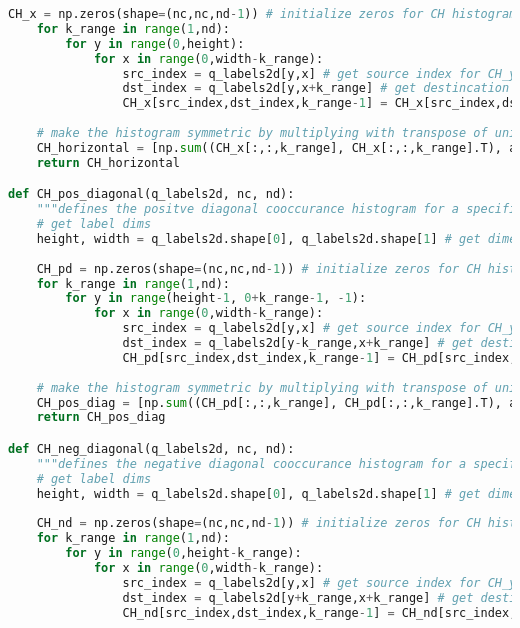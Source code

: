 \begin{lstlisting}[language=Python, caption={Additional functions for Co-occurrence Histogram Detection}, captionpos=b, label={lst:supportCH}]
    CH_x = np.zeros(shape=(nc,nc,nd-1)) # initialize zeros for CH histogram according to quantizations size
    for k_range in range(1,nd):
        for y in range(0,height):
            for x in range(0,width-k_range):
                src_index = q_labels2d[y,x] # get source index for CH_y at (y,x)
                dst_index = q_labels2d[y,x+k_range] # get destincation index for CH_y at (y+k,x)
                CH_x[src_index,dst_index,k_range-1] = CH_x[src_index,dst_index,k_range-1] + 1 # update histogram count in bin (src_index,dst_index)
    
    # make the histogram symmetric by multiplying with transpose of unidirectional cooccurance histogram
    CH_horizontal = [np.sum((CH_x[:,:,k_range], CH_x[:,:,k_range].T), axis=0) for k_range in range(0,nd-1)]
    return CH_horizontal

def CH_pos_diagonal(q_labels2d, nc, nd):
    """defines the positve diagonal cooccurance histogram for a specifica template according to quantized colourspace labels"""
    # get label dims
    height, width = q_labels2d.shape[0], q_labels2d.shape[1] # get dimensions
    
    CH_pd = np.zeros(shape=(nc,nc,nd-1)) # initialize zeros for CH histogram according to quantizations size
    for k_range in range(1,nd):
        for y in range(height-1, 0+k_range-1, -1):
            for x in range(0,width-k_range):
                src_index = q_labels2d[y,x] # get source index for CH_y at (y,x)
                dst_index = q_labels2d[y-k_range,x+k_range] # get destincation index for CH_y at (y+k,x)
                CH_pd[src_index,dst_index,k_range-1] = CH_pd[src_index,dst_index,k_range-1] + 1 # update histogram count in bin (src_index,dst_index)
    
    # make the histogram symmetric by multiplying with transpose of unidirectional cooccurance histogram
    CH_pos_diag = [np.sum((CH_pd[:,:,k_range], CH_pd[:,:,k_range].T), axis=0) for k_range in range(0,nd-1)]
    return CH_pos_diag

def CH_neg_diagonal(q_labels2d, nc, nd):
    """defines the negative diagonal cooccurance histogram for a specific template according to quantized colourspace labels"""
    # get label dims
    height, width = q_labels2d.shape[0], q_labels2d.shape[1] # get dimensions
        
    CH_nd = np.zeros(shape=(nc,nc,nd-1)) # initialize zeros for CH histogram according to quantizations size
    for k_range in range(1,nd):
        for y in range(0,height-k_range):
            for x in range(0,width-k_range):
                src_index = q_labels2d[y,x] # get source index for CH_y at (y,x)
                dst_index = q_labels2d[y+k_range,x+k_range] # get destincation index for CH_y at (y+k,x)
                CH_nd[src_index,dst_index,k_range-1] = CH_nd[src_index,dst_index,k_range-1] + 1 # update histogram count in bin (src_index,dst_index)
    

\end{lstlisting}
